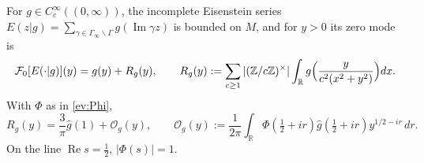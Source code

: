 \begin{lemma}\label{ev:scattering}
For $g\in C_c^\infty((0,\infty))$, the incomplete Eisenstein series
$E(z|g)=\sum_{\gamma\in\Gamma_\infty\backslash\Gamma}g(\operatorname{Im}\gamma z)$ is bounded on $M$, and for $y>0$ its zero mode is
\begin{equation}\label{ev:zero}
 \mathcal F_0[E(\cdot|g)](y)=g(y)+R_g(y),\qquad
 R_g(y):=\sum_{c\ge1}|(\mathbb Z/c\mathbb Z)^\times|\int_{\mathbb R}g\Bigl(\frac{y}{c^2(x^2+y^2)}\Bigr)dx .
\end{equation}
With $\Phi$ as in \eqref{ev:Phi},
\begin{equation}\label{ev:R}
 R_g(y)=\frac3\pi\hat g(1)+\mathcal O_g(y),\qquad
 \mathcal O_g(y):=\frac1{2\pi}\int_{\mathbb R}\Phi(\tfrac12+ir)\hat g(\tfrac12+ir)y^{1/2-ir}\,dr .
\end{equation}
On the line $\operatorname{Re}s=\tfrac12$, $|\Phi(s)|=1$.
\end{lemma}
